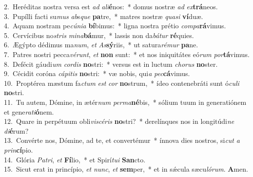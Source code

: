 {2.~}Heréditas nostra versa est \textit{ad} \textit{a}\textit{li}\textbf{é}nos:~* domus nostræ \textit{ad} \textit{ex}\textbf{trá}neos.\\
{3.~}Pupílli facti su\textit{mus} \textit{ab}s\textit{que} \textbf{pa}tre,~* matres nostræ \textit{qua}\textit{si} \textbf{ví}duæ.\\
{4.~}Aquam nostram pe\textit{cú}\textit{ni}\textit{a} \textbf{bí}bimus:~* ligna nostra prétio \textit{com}\textit{pa}\textbf{rá}vimus.\\
{5.~}Cervícibus no\textit{stris} \textit{mi}\textit{na}\textbf{bá}mur,~* lassis non da\textit{bá}\textit{tur} \textbf{ré}quies.\\
{6.~}Ægýpto dédimus ma\textit{num}, \textit{et} \textit{As}\textbf{sý}riis,~* ut satura\textit{ré}\textit{mur} \textbf{pa}ne.\\
{7.~}Patres nostri pecca\textit{vé}\textit{runt}, \textit{et} \textbf{non} sunt:~* et nos iniquitátes eó\textit{rum} \textit{por}\textbf{tá}vimus.\\
{8.~}Defécit gáudi\textit{um} \textit{cor}\textit{dis} \textbf{no}stri:~* versus est in luctum \textit{cho}\textit{rus} \textbf{no}ster.\\
{9.~}Cécidit coróna \textit{cá}\textit{pi}\textit{tis} \textbf{no}stri:~* væ nobis, qui\textit{a} \textit{pec}\textbf{cá}vimus.\\
{10.~}Proptérea mæstum fa\textit{ctum} \textit{est} \textit{cor} \textbf{no}strum,~* ídeo contenebráti sunt ó\textit{cu}\textit{li} \textbf{no}stri.\\
{11.~}Tu autem, Dómine, in ætér\textit{num} \textit{per}\textit{ma}\textbf{né}bis,~* sólium tuum in generatiónem et gene\textit{ra}\textit{ti}\textbf{ó}nem.\\
{12.~}Quare in perpétuum obli\textit{vi}\textit{scé}\textit{ris} \textbf{no}stri?~* derelínques nos in longitúdi\textit{ne} \textit{di}\textbf{é}rum?\\
{13.~}Convérte nos, Dómine, ad te, et convertémur~* ínnova dies nostros, si\textit{cut} \textit{a} \textit{prin}\textbf{cí}pio.\\
{14.~}Glória \textit{Pa}\textit{tri}, \textit{et} \textbf{Fí}lio,~* et Spirí\textit{tu}\textit{i} \textbf{San}cto.\\
{15.~}Sicut erat in princípio, \textit{et} \textit{nunc}, \textit{et} \textbf{sem}per,~* et in sǽcula sæcu\textit{ló}\textit{rum}. \textbf{A}men.\\
